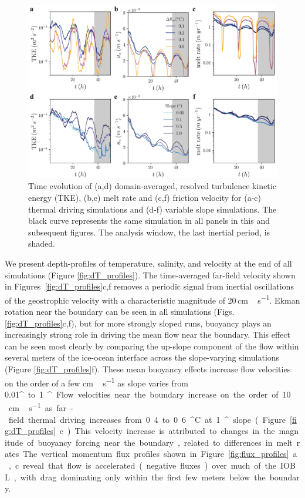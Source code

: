 \documentclass[tc, manuscript]{copernicus}
\begin{document}
\begin{figure}[t]
\includegraphics[width=12cm]{fig1_rev1.pdf}
\caption{Time evolution of (a,d) domain-averaged, resolved turbulence kinetic energy (TKE), (b,e) melt rate and (c,f) friction velocity for (a-c) thermal driving simulations and (d-f) variable slope simulations. The black curve represents the same simulation in all panels in this and subsequent figures. The analysis window, the last inertial period, is shaded.}
\label{fig:timeseries}
\end{figure}

We present depth-profiles of temperature, salinity, and velocity at the end of all simulations (Figure \ref{fig:dT_profiles}). The time-averaged far-field velocity shown in Figures~\ref{fig:dT_profiles}c,f removes a periodic signal from inertial oscillations of the geostrophic velocity with a characteristic magnitude of 20\,\unit{cm\,s^{-1}}. Ekman rotation near the boundary can be seen in all simulations (Figs. \ref{fig:dT_profiles}c,f), but for more strongly sloped runs, buoyancy plays an increasingly strong role in driving the mean flow near the boundary. This effect can be seen most clearly by comparing the up-slope component of the flow within several meters of the ice-ocean interface across the slope-varying simulations (Figure \ref{fig:dT_profiles}f). These mean buoyancy effects increase flow velocities on the order of a few \unit{cm\,s^{-1}} as slope varies from 0.01\unit{^{\circ}} to 1\unit{^{\circ}}. Flow velocities near the boundary increase on the order of 10\,\unit{cm\,s^{-1}} as far-field thermal driving increases from 0.4 to 0.6\unit{^{\circ}C} at 1\unit{^{\circ}} slope (Figure \ref{fig:dT_profiles}c). This velocity increase is attributed to changes in the magnitude of buoyancy forcing near the boundary, related to differences in melt rates. The vertical momentum flux profiles shown in Figure~\ref{fig:flux_profiles}a,c reveal that flow is accelerated (negative fluxes) over much of the IOBL, with drag dominating only within the first few meters below the boundary.
 
\end{document}
